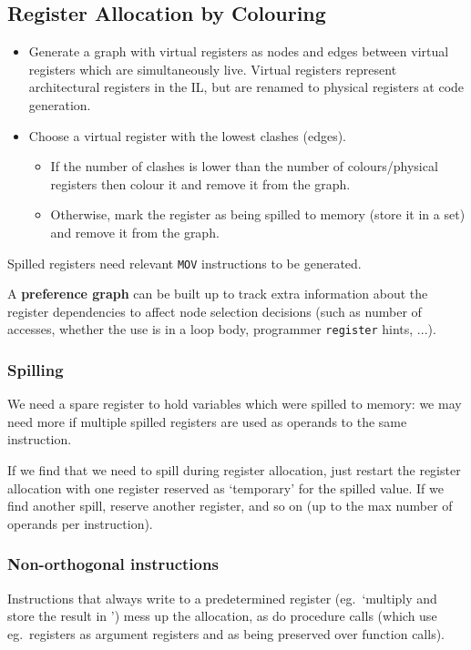 \documentclass[a4paper, 11pt]{article}
\begin{document}
{    \subsection*{Register Allocation by Colouring}
    {
        \begin{itemize}
        \item Generate a graph with virtual registers as nodes and edges between virtual registers which are simultaneously live. Virtual registers represent architectural registers in the IL, but are renamed to physical registers at code generation.
        \item
        {
            Choose a virtual register with the lowest clashes (edges).

            \begin{itemize}
            \item If the number of clashes is lower than the number of colours/physical registers then colour it and remove it from the graph.
            \item Otherwise, mark the register as being spilled to memory (store it in a set) and remove it from the graph.
            \end{itemize}
        }
        \end{itemize}
            
        Spilled registers need relevant \texttt{MOV} instructions to be generated.

        A \textbf{preference graph} can be built up to track extra information about the register dependencies to affect node selection decisions (such as number of accesses, whether the use is in a loop body, programmer \texttt{register} hints, ...).

        \subsubsection*{Spilling}
        {
            We need a spare register to hold variables which were spilled to memory: we may need more if multiple spilled registers are used as operands to the same instruction.

            If we find that we need to spill during register allocation, just restart the register allocation with one register reserved as `temporary' for the spilled value. If we find another spill, reserve another register, and so on (up to the max number of operands per instruction).
        }
        \subsubsection*{Non-orthogonal instructions}
        {
            Instructions that always write to a predetermined register (eg.\ `multiply and store the result in ') mess up the allocation, as do procedure calls (which use eg.\ registers  as argument registers and  as being preserved over function calls).

}}}
\end{document}
